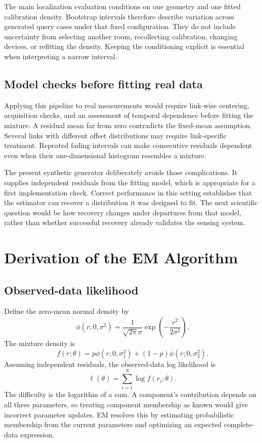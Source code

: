 \documentclass[conference,letterpaper]{IEEEtran}
\begin{document}
The main localization evaluation conditions on one geometry and one fitted calibration density. Bootstrap intervals therefore describe variation across generated query cases under that fixed configuration. They do not include uncertainty from selecting another room, recollecting calibration, changing devices, or refitting the density. Keeping the conditioning explicit is essential when interpreting a narrow interval.

\subsection{Model checks before fitting real data}
Applying this pipeline to real measurements would require link-wise centering, acquisition checks, and an assessment of temporal dependence before fitting the mixture. A residual mean far from zero contradicts the fixed-mean assumption. Several links with different offset distributions may require link-specific treatment. Repeated fading intervals can make consecutive residuals dependent even when their one-dimensional histogram resembles a mixture.

The present synthetic generator deliberately avoids those complications. It supplies independent residuals from the fitting model, which is appropriate for a first implementation check. Correct performance in this setting establishes that the estimator can recover a distribution it was designed to fit. The next scientific question would be how recovery changes under departures from that model, rather than whether successful recovery already validates the sensing system.

\section{Derivation of the EM Algorithm}
\label{sec:em}
\subsection{Observed-data likelihood}
Define the zero-mean normal density by
\begin{equation}
\phi(r;0,\sigma^2)=\frac{1}{\sqrt{2\pi}\sigma}
\exp\left(-\frac{r^2}{2\sigma^2}\right).
\end{equation}
The mixture density is
\begin{equation}
f(r;\theta)=p\phi(r;0,\sigma_1^2)+(1-p)\phi(r;0,\sigma_2^2).
\label{eq:mixture}
\end{equation}
Assuming independent residuals, the observed-data log likelihood is
\begin{equation}
\ell(\theta)=\sum_{i=1}^{N}\log f(r_i;\theta).
\label{eq:ll}
\end{equation}
The difficulty is the logarithm of a sum. A component's contribution depends on all three parameters, so treating component membership as known would give incorrect parameter updates. EM resolves this by estimating probabilistic membership from the current parameters and optimizing an expected complete-data expression.
\end{document}
